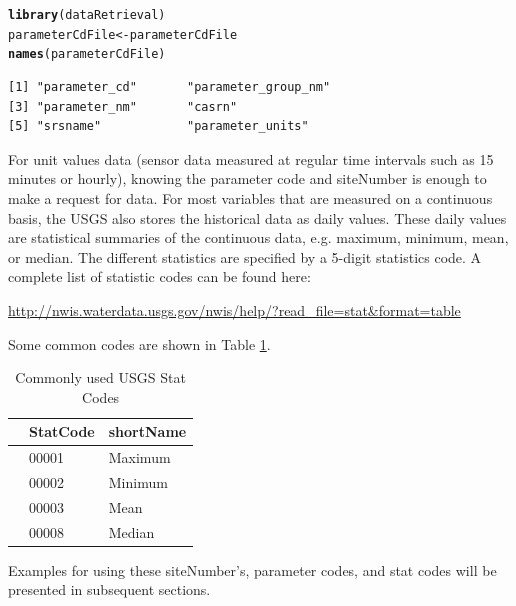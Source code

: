 \documentclass[a4paper,11pt]{article}\usepackage[]{graphicx}\usepackage[]{color}
\makeatletter
\newcommand{\hlstd}[1]{\textcolor[rgb]{0.345,0.345,0.345}{#1}}%
\newcommand{\hlkwb}[1]{\textcolor[rgb]{0.69,0.353,0.396}{#1}}%
\newcommand{\hlkwd}[1]{\textcolor[rgb]{0.737,0.353,0.396}{\textbf{#1}}}%
\newenvironment{kframe}{%
 \def\at@end@of@kframe{}%
 \ifinner\ifhmode%
  \def\at@end@of@kframe{\end{minipage}}%
  \begin{minipage}{\columnwidth}%
 \fi\fi%
 \def\FrameCommand##1{\hskip\@totalleftmargin \hskip-\fboxsep
 \colorbox{shadecolor}{##1}\hskip-\fboxsep
     \hskip-\linewidth \hskip-\@totalleftmargin \hskip\columnwidth}%
 \MakeFramed {\advance\hsize-\width
   \@totalleftmargin\z@ \linewidth\hsize
   \@setminipage}}%
 {\par\unskip\endMakeFramed%
 \at@end@of@kframe}
\newenvironment{knitrout}{}{} %
\makeatother
\begin{document}
\begin{knitrout}
\color{fgcolor}\begin{kframe}
\begin{alltt}
\hlkwd{library}\hlstd{(dataRetrieval)}
\hlstd{parameterCdFile} \hlkwb{<-}  \hlstd{parameterCdFile}
\hlkwd{names}\hlstd{(parameterCdFile)}
\end{alltt}
\begin{verbatim}
[1] "parameter_cd"       "parameter_group_nm"
[3] "parameter_nm"       "casrn"             
[5] "srsname"            "parameter_units"   
\end{verbatim}
\end{kframe}
\end{knitrout}


For unit values data (sensor data measured at regular time intervals such as 15 minutes or hourly), knowing the parameter code and siteNumber is enough to make a request for data.  For most variables that are measured on a continuous basis, the USGS also stores the historical data as daily values.  These daily values are statistical summaries of the continuous data, e.g. maximum, minimum, mean, or median. The different statistics are specified by a 5-digit statistics code.  A complete list of statistic codes can be found here:

\url{http://nwis.waterdata.usgs.gov/nwis/help/?read_file=stat&format=table}

Some common codes are shown in Table \ref{tab:stat}.

\begin{table}[ht]
\caption{Commonly used USGS Stat Codes} 
\label{tab:stat}
{\footnotesize
\begin{tabular}{rll}
  \hline
 & \multicolumn{1}{c}{\textbf{\textsf{StatCode}}} & \multicolumn{1}{c}{\textbf{\textsf{shortName}}} \\ 
  \hline
 & 00001 & Maximum \\ 
  [5pt] & 00002 & Minimum \\ 
  [5pt] & 00003 & Mean \\ 
  [5pt] & 00008 & Median \\ 
   \hline
\end{tabular}
}
\end{table}


Examples for using these siteNumber's, parameter codes, and stat codes will be presented in subsequent sections.
\end{document}
